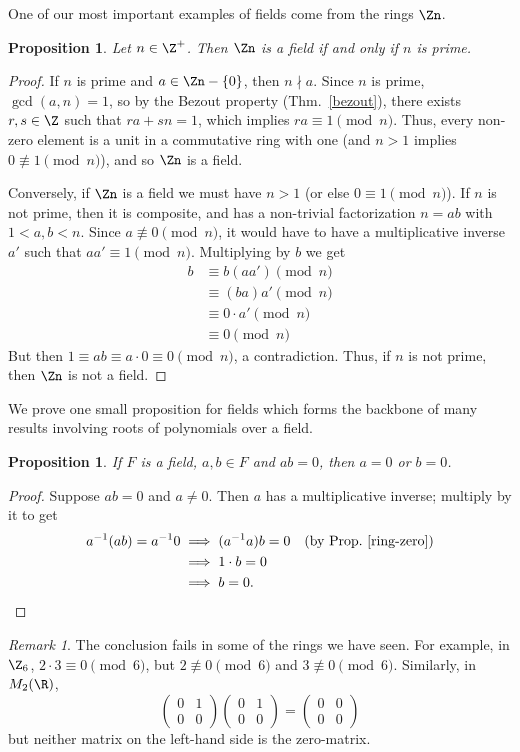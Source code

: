 \documentclass[12pt]{amsart}
\theoremstyle{plain}
\newtheorem{prop}[thm]{Proposition}
\theoremstyle{definition}
\theoremstyle{remark}
\newtheorem*{remark}{Remark}
\begin{document}
One of our most important examples of fields come from the rings $\Zn$.
\begin{prop} \label{zn-field}
  Let $n\in\Z^+$.  Then $\Zn$ is a field if and only if $n$ is prime.
\end{prop}
\begin{proof}
  If $n$ is prime and $a\in \Zn-\{0\}$, then $n\nmid a$.  Since $n$ is
  prime, $\gcd(a,n)=1$, so by the Bezout property (Thm.~\ref{bezout}),
  there exists $r,s\in\Z$ such that $ra+sn=1$, which implies $ra\equiv
  1\pmod n$.  Thus, every non-zero element is a unit in a commutative
  ring with one (and $n>1$ implies $0\not\equiv 1\pmod n$), and so
  $\Zn$ is a field.

  Conversely, if $\Zn$ is a field we must have $n>1$ (or else $0\equiv
  1\pmod n$).  If $n$ is not prime, then it is composite, and has a
  non-trivial factorization $n=ab$ with $1<a,b<n$.  Since $a\not\equiv
  0\pmod n$, it would have to have a multiplicative inverse $a'$ such
  that $aa'\equiv 1\pmod n$.  Multiplying by $b$ we get
  \begin{align*}
    b &\equiv b(aa') \pmod n \\
    &\equiv (ba)a' \pmod n \\
    &\equiv 0\cdot a' \pmod n \\
    &\equiv 0 \pmod n
  \end{align*}
  But then $1\equiv ab \equiv a\cdot 0 \equiv 0\pmod n$, a
  contradiction.  Thus, if $n$ is not prime, then $\Zn$ is not a field.
\end{proof}
We prove one small proposition for fields which forms the backbone of
many results involving roots of polynomials over a field.
\begin{prop}
  If $F$ is a field, $a,b\in F$ and $ab=0$, then $a=0$ or $b=0$.
\end{prop}
\begin{proof}
  Suppose $ab=0$ and $a\neq 0$.  Then $a$ has a multiplicative
  inverse; multiply by it to get
\begin{align*}
  a^{-1}(ab) = a^{-1}0 &\implies (a^{-1}a)b = 0 &\text{(by
    Prop.~\ref{ring-zero})} \\
  &\implies 1\cdot b = 0 \\
  &\implies b=0.
\end{align*}
\end{proof}
\begin{remark}
  The conclusion fails in some of the rings we have seen.  For
  example, in $\Z_6$, $2\cdot 3 \equiv 0\pmod 6$, but $2\not\equiv
  0\pmod 6$ and $3\not\equiv 0\pmod 6$.  Similarly, in $M_2(\R)$,\
  \[ \begin{pmatrix} 0 & 1\\0 &0\end{pmatrix}\begin{pmatrix} 0 & 1\\0
    & 0\end{pmatrix} = \begin{pmatrix} 0 & 0\\0 &0\end{pmatrix}\]
  but neither matrix on the left-hand side is the zero-matrix.
\end{remark}
\end{document}
